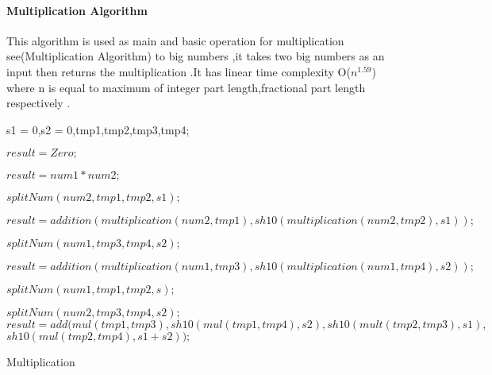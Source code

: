\paragraph{Multiplication Algorithm}
This algorithm is used as main and basic operation for multiplication see(Multiplication Algorithm) to big numbers ,it takes two big numbers as an input then returns the multiplication .It has linear time complexity O($n^{1.59}$) where n is equal to maximum of integer part length,fractional part length respectively .
\newline\newline\newline\newline\newline\newline\newline\newline\newline
\begin{algorithm}[H]
	\SetAlgoLined
	s1 = 0,s2 = 0,tmp1,tmp2,tmp3,tmp4;

	{
		$result = Zero;$
	}
	
	{
		$result = num1 * num2;$ 
	}
	{
		{
			$splitNum(num2,tmp1,tmp2,s1);$
			
			$result = addition(multiplication(num2,tmp1),sh10(multiplication(num2,tmp2),s1));$	
		}
		{
				{
						$splitNum(num1,tmp3,tmp4,s2);$
					
						$result = addition(multiplication(num1,tmp3),sh10(multiplication(num1,tmp4),s2));$
			
				}
				{
					$splitNum(num1,tmp1,tmp2,s);$
					
					$splitNum(num2,tmp3,tmp4,s2);$
					$result = add(mul(tmp1,tmp3),sh10(mul(tmp1,tmp4),s2),sh10(mult(tmp2,tmp3),s1),$
					$sh10(mul(tmp2,tmp4),s1+s2));$
				
				}
	
		}	
	
	}

	\caption{Multiplication}
	\label{multiplication_Algorithm}
\end{algorithm}



